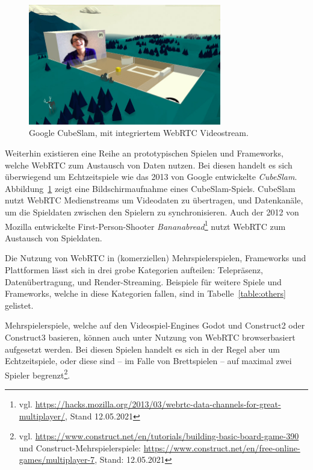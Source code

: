 \begin{figure}[h]
\centering
\includegraphics[width=0.75\textwidth]{bilder/cubeslam.jpg}
\caption{Google CubeSlam, mit integriertem WebRTC Videostream.}
\label{fig:cuubslam}
\end{figure}

Weiterhin existieren eine Reihe an prototypischen Spielen und Frameworks, welche \acs{WebRTC} zum Austausch von Daten nutzen. Bei diesen handelt es sich überwiegend um Echtzeitspiele wie das 2013 von Google entwickelte \textit{CubeSlam}. Abbildung~\ref{fig:cuubslam} zeigt eine Bildschirmaufnahme eines CubeSlam-Spiels. CubeSlam nutzt \acs{WebRTC} Medienstreams um Videodaten zu übertragen, und Datenkanäle, um die Spieldaten zwischen den Spielern zu synchronisieren. Auch der 2012 von Mozilla entwickelte First-Person-Shooter \textit{Bananabread}\footnote{vgl. \url{https://hacks.mozilla.org/2013/03/webrtc-data-channels-for-great-multiplayer/}, Stand 12.05.2021} nutzt WebRTC zum Austausch von Spieldaten.\par

Die Nutzung von WebRTC in (komerziellen) Mehrspielerspielen, Frameworks und Plattformen lässt sich in drei grobe Kategorien aufteilen: Telepräsenz, Datenübertragung, und Render-Streaming. Beispiele für weitere Spiele und Frameworks, welche in diese Kategorien fallen, sind in Tabelle~\ref{table:others} gelistet.

Mehrspielerspiele, welche auf den Videospiel-Engines Godot und Construct2 oder Construct3 basieren, können auch unter Nutzung von WebRTC browserbasiert aufgesetzt werden. Bei diesen Spielen handelt es sich in der Regel aber um Echtzeitspiele, oder diese sind -- im Falle von Brettspielen -- auf maximal zwei Spieler begrenzt\footnote{vgl. \url{https://www.construct.net/en/tutorials/building-basic-board-game-390} und Construct-Mehrspielerspiele: \url{https://www.construct.net/en/free-online-games/multiplayer-7}, Stand: 12.05.2021}.\par 

